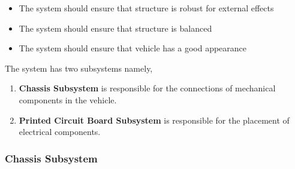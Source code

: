\documentclass[a4paper,12pt]{article}
\begin{document}
\begin{itemize}

\item The system should	ensure that structure is robust for external effects 

\item The system should	ensure that structure is balanced

\item The system should ensure that vehicle has a good appearance

\end{itemize}	



\noindent The system has two subsystems namely,


\begin{enumerate}

\item \textbf{Chassis Subsystem} is responsible for the connections of mechanical components in the vehicle.

\item \textbf{Printed Circuit Board Subsystem} is responsible for the placement of electrical components.

\end{enumerate}



\subsubsection{Chassis Subsystem}
\end{document}
